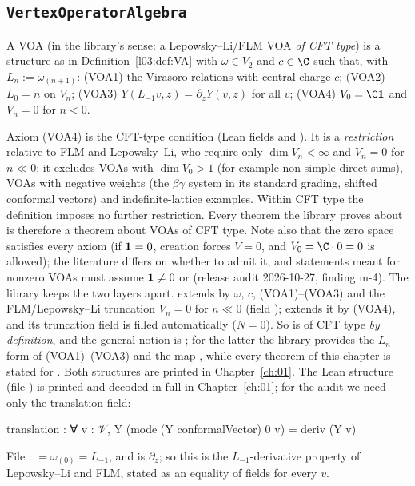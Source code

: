 \subsection{\texttt{VertexOperatorAlgebra}}

\begin{definition}\label{l03:def:VOA}
A VOA (in the library's sense: a Lepowsky--Li/FLM VOA \emph{of CFT type}) is a structure as in
Definition~\ref{l03:def:VA} with $\omega\in V_2$ and
$c\in\C$ such that, with $L_n := \omega_{(n+1)}$: (VOA1) the Virasoro relations with central charge
$c$; (VOA2) $L_0 = n$ on $V_n$; (VOA3) $Y(L_{-1}v,z) = \partial_zY(v,z)$ for all $v$; (VOA4)
$V_0 = \C\lthreevac$ and $V_n = 0$ for $n<0$.
\end{definition}
Axiom (VOA4) is the CFT-type condition (Lean fields  and ). It is a
\emph{restriction} relative to FLM and Lepowsky--Li, who require only $\dim V_n<\infty$ and $V_n = 0$ for $n\ll0$: it
excludes VOAs with $\dim V_0>1$ (for example non-simple direct sums), VOAs with negative weights (the $\beta\gamma$
system in its standard grading, shifted conformal vectors) and indefinite-lattice examples. Within CFT type the
definition imposes no further restriction. Every theorem the library proves about  is
therefore a theorem about VOAs of CFT type. Note also that the zero space satisfies every axiom (if
$\mathbf{1} = 0$, creation forces $V = 0$, and $V_0 = \C\cdot 0 = 0$ is allowed); the literature differs on whether to
admit it, and statements meant for nonzero VOAs must assume $\mathbf{1}\neq 0$ or  (release audit
2026-10-27, finding m-4).
The library keeps the two layers apart.  extends  by
$\omega$, $c$, (VOA1)--(VOA3) and the FLM/Lepowsky--Li truncation $V_n = 0$ for $n\ll 0$ (field
);  extends it by (VOA4), and its truncation field is filled
automatically ($N = 0$). So  is of CFT type \emph{by definition}, and the general notion is
; for the latter the library provides the $L_n$ form of (VOA1)--(VOA3) and the map
, while every theorem of this chapter is stated for
. Both structures are printed in Chapter~\ref{ch:01}.
The Lean structure  (file
) is printed and decoded in
full in Chapter~\ref{ch:01}; for the audit we need only the translation field:
\begin{leancode}
  translation : ∀ v : 𝒱, Y (mode (Y conformalVector) 0 v) = deriv (Y v)
\end{leancode}
File : 
$=\omega_{(0)} = L_{-1}$, and  is $\partial_z$; so this is the $L_{-1}$-derivative
property of Lepowsky--Li and FLM, stated as an equality of fields for every $v$.

